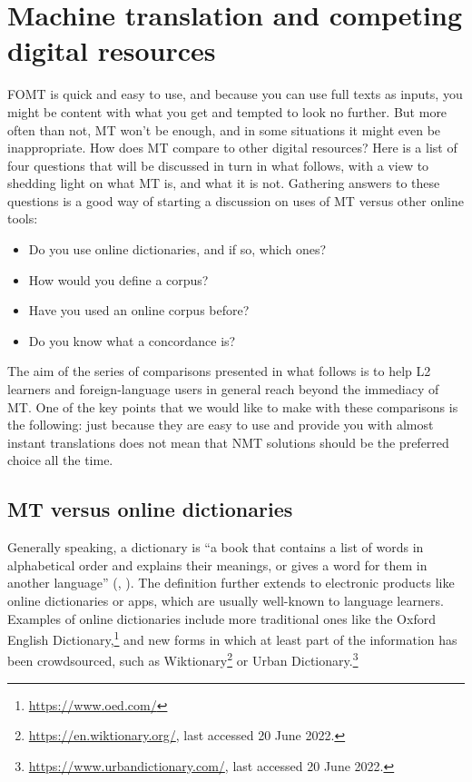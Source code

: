 \documentclass[output=paper,colorlinks,citecolor=brown,
]{langscibook}
\begin{document}
\section{Machine translation and competing digital resources}

FOMT is quick and easy to use, and because you can use full texts as inputs, you might be content with what you get and tempted to look no further. But more often than not, MT won’t be enough, and in some situations it might even be inappropriate. How does MT compare to other digital resources? Here is a list of four questions that will be discussed in turn in what follows, with a view to shedding light on what MT is, and what it is not. Gathering answers to these questions is a good way of starting a discussion on uses of MT versus other online tools: 

\begin{itemize}
\item Do you use online dictionaries, and if so, which ones?
\item How would you define a corpus?
\item Have you used an online corpus before?
\item Do you know what a concordance is?
\end{itemize}

The aim of the series of comparisons presented in what follows is to help L2 learners and foreign-language users in general reach beyond the immediacy of MT. One of the key points that we would like to make with these comparisons is the following: just because they are easy to use and provide you with almost instant translations does not mean that NMT solutions should be the preferred choice all the time.

\subsection{MT versus online dictionaries}

Generally speaking, a dictionary is “a book that contains a list of words in alphabetical order and explains their meanings, or gives a word for them in another language” (, \citeyear{Cambridge2020}). The definition further extends to electronic products like online dictionaries or apps, which are usually well-known to language learners. Examples of online dictionaries include more traditional ones like the Oxford English Dictionary,\footnote{\url{https://www.oed.com/}}  and new forms in which at least part of the information has been crowdsourced, such as Wiktionary\footnote{\url{https://en.wiktionary.org/}, last accessed 20 June 2022.} or Urban Dictionary.\footnote{\url{https://www.urbandictionary.com/}, last accessed 20 June 2022.}
\end{document}
